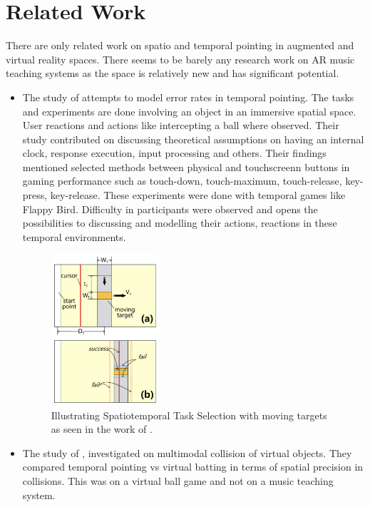 \documentclass{article}
\begin{document}
\section{Related Work}
There are only related work on spatio and temporal pointing in augmented and virtual reality spaces. There seems to be barely any research work on AR music teaching systems as the space is relatively new and has significant potential.\\
\begin{itemize}
\item The study of \cite{lee2016modelling} attempts to model error rates in temporal pointing. The tasks and experiments are done involving an object in an immersive spatial space. User reactions and actions like intercepting a ball where observed. Their study contributed on discussing theoretical assumptions on having an internal clock, response execution, input processing and others. Their findings mentioned selected methods between physical and touchscreenn buttons in gaming performance such as touch-down, touch-maximum, touch-release, key-press, key-release. These experiments were done with temporal games like Flappy Bird. Difficulty in participants were observed and opens the possibilities to discussing and modelling their actions, reactions in these temporal environments.
\begin{figure}[htbo]
\centering
 \includegraphics[width=4cm]{figures/spatiotemporalmovingtargetselection.png}
    \caption{Illustrating Spatiotemporal Task Selection with moving targets as seen in the work of \cite{lee2016modelling}.
 }\label{fig:spatiotemporaltask}
\end{figure}
\item The study of \cite{lee2017boxer}, investigated on multimodal collision of virtual objects. They compared temporal pointing vs virtual batting in terms of spatial precision in collisions. This was on a virtual ball game and not on a music teaching system.


\end{itemize}
\end{document}
